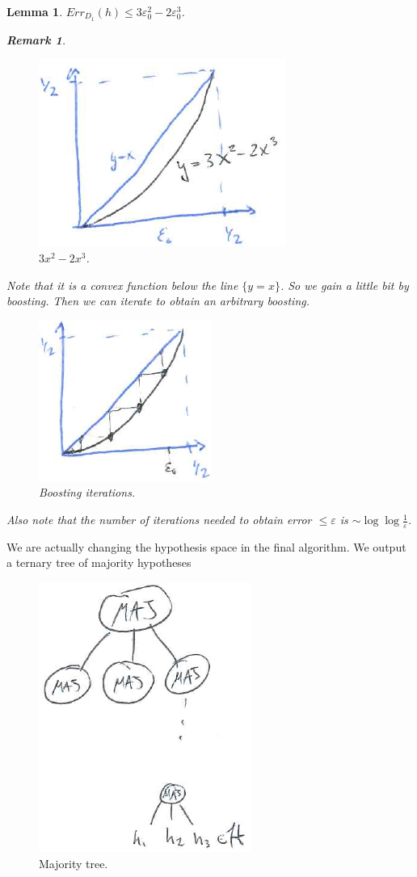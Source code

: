\documentclass[12pt, letterpaper]{article}
\numberwithin{equation}{section} %
\newcommand{\ve}{\varepsilon}
\newtheorem{lemma}[theorem]{Lemma}
\newtheorem{remark}[theorem]{Remark}
\theoremstyle{definition}
\theoremstyle{remark}
\begin{document}
\begin{lemma}
$Err_{D_1}(h) \leq 3\ve_0^2 - 2\ve_0^3$.
\begin{remark}
\begin{figure}[H]
\centering
\includegraphics[width=0.3\linewidth]{img/boosting-bound.png}
\caption{$3x^2 - 2x^3$.}
\end{figure}
Note that it is a convex function below the line $\lbrace y = x\rbrace$. So we gain a little bit by boosting. Then we can iterate to obtain an arbitrary boosting.
\begin{figure}[H]
\centering
\includegraphics[width=0.3\linewidth]{img/boosting-iteration.png}
\caption{Boosting iterations.}
\end{figure}
Also note that the number of iterations needed to obtain error $\leq \ve$ is $\sim \log\log\frac1\ve$.
\end{remark}
\end{lemma}

We are actually changing the hypothesis space in the final algorithm. We output a ternary tree of majority hypotheses
\begin{figure}[H]
\centering
\includegraphics[width=0.3\linewidth]{img/majority-tree.png}
\caption{Majority tree.}
\end{figure}
\end{document}
